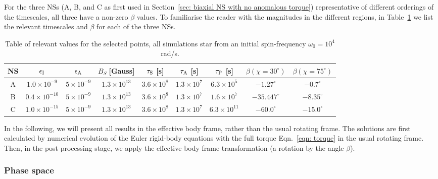 \documentclass[../full_thesis/full_thesis.tex]{subfiles}
\begin{document}
For the three NSs (A, B, and C as first used in Section~\ref{sec: biaxial NS with no anomalous torque}) representative of different orderings of the timescales, all
three have a non-zero $\beta$ values. To familiarise the reader with the magnitudes in
the different regions, in Table~\ref{tab: A B C params beta} we list the relevant
timescales and $\beta$ for each of the three NSs.
\begin{table}[ht]
{\footnotesize
\centering
	\begin{tabular}[ht]{|c|c|c|c|c|c|c|c|c|}\hline
NS &  $\epsilon_{\mathrm{I}}$  & $\epsilon_{\mathrm{A}} $ & 	$B_{S} \; $[Gauss] & $\tau_{\mathrm{S}}$ [s] & $\tau_{\mathrm{A}}$ [s] & $ \tau_{\mathrm{P}}$  [s] & $\beta (\chi=30^{\circ})$ & $\beta(\chi=75^{\circ})$ \\ \hline
A & $  1.0\times 10^{-9}  $ & $  5\times 10^{-9}  $ & $  1.3\times 10^{13}  $ & $  3.6\times 10^{8}  $ & $  1.3\times 10^{7}  $ & $  6.3\times 10^{5}  $ & $ -1.27^{\circ} $& $ -0.7^{\circ} $ \\
B & $  0.4\times 10^{-10}  $ & $  5\times 10^{-9}  $ & $  1.3\times 10^{13}  $ & $  3.6\times 10^{8}  $ & $  1.3\times 10^{7}  $ & $  1.6\times 10^{7}  $ & $ -35.447^{\circ} $& $ -8.35^{\circ} $ \\
C & $  1.0\times 10^{-15}  $ & $  5\times 10^{-9}  $ & $  1.3\times 10^{13}  $ & $  3.6\times 10^{8}  $ & $  1.3\times 10^{7}  $ & $  6.3\times 10^{11}  $ & $ -60.0^{\circ} $& $ -15.0^{\circ} $ \\ \hline
	\end{tabular}}
\caption{Table of relevant values for the selected points, all simulations star
from an initial spin-frequency $\omega_0=10^{4}$ rad/s.}
\label{tab: A B C params beta}
\end{table}

In the following, we will present all results in the effective body frame,
rather than the usual rotating frame. The solutions are first calculated by
numerical evolution of the Euler rigid-body equations with the full torque
Eqn.~\eqref{eqn: torque} in the usual rotating frame. Then, in the
post-processing stage, we apply the effective body frame transformation (a
rotation by the angle $\beta$).

\subsubsection{Phase space}
\end{document}
